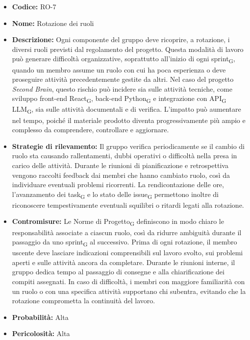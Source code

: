 ﻿\documentclass[a4paper, 10pt, colorlinks=true, linkcolor=black, urlcolor=blue, citecolor=blue, hidelinks]{article}
\begin{document}
\begin{itemize}
    \item \textbf{Codice:} RO-7

    \item \textbf{Nome:} Rotazione dei ruoli

    \item \textbf{Descrizione:} Ogni componente del gruppo deve ricoprire, a rotazione, i diversi ruoli previsti dal regolamento del progetto. Questa modalità di lavoro può generare difficoltà organizzative, soprattutto all'inizio di ogni sprint\textsubscript{G}, quando un membro assume un ruolo con cui ha poca esperienza o deve proseguire attività precedentemente gestite da altri. Nel caso del progetto \textit{Second Brain}, questo rischio può incidere sia sulle attività tecniche, come sviluppo front-end React\textsubscript{G}, back-end Python\textsubscript{G} e integrazione con API\textsubscript{G} LLM\textsubscript{G}, sia sulle attività documentali e di verifica. L'impatto può aumentare nel tempo, poiché il materiale prodotto diventa progressivamente più ampio e complesso da comprendere, controllare e aggiornare.

    \item \textbf{Strategie di rilevamento:} Il gruppo verifica periodicamente se il cambio di ruolo sta causando rallentamenti, dubbi operativi o difficoltà nella presa in carico delle attività. Durante le riunioni di pianificazione e retrospettiva vengono raccolti feedback dai membri che hanno cambiato ruolo, così da individuare eventuali problemi ricorrenti. La rendicontazione delle ore, l'avanzamento dei task\textsubscript{G} e lo stato delle issue\textsubscript{G} permettono inoltre di riconoscere tempestivamente eventuali squilibri o ritardi legati alla rotazione.

    \item \textbf{Contromisure:} Le Norme di Progetto\textsubscript{G} definiscono in modo chiaro le responsabilità associate a ciascun ruolo, così da ridurre ambiguità durante il passaggio da uno sprint\textsubscript{G} al successivo. Prima di ogni rotazione, il membro uscente deve lasciare indicazioni comprensibili sul lavoro svolto, sui problemi aperti e sulle attività ancora da completare. Durante le riunioni interne, il gruppo dedica tempo al passaggio di consegne e alla chiarificazione dei compiti assegnati. In caso di difficoltà, i membri con maggiore familiarità con un ruolo o con una specifica attività supportano chi subentra, evitando che la rotazione comprometta la continuità del lavoro.

    \item \textbf{Probabilità:} Alta

    \item \textbf{Pericolosità:} Alta
\end{itemize}
\end{document}
